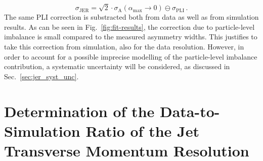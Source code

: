 \begin{equation}
\sigma_\mathrm{JER} =  \sqrt{2} \cdot \sigma_\mathrm{A}(\alpha_\mathrm{max} \rightarrow 0) \ominus \sigma_\mathrm{PLI} \, .
\end{equation}  
The same PLI correction is substracted both from data as well as from simulation results. As can be seen in Fig.~\ref{fig:fit-results}, the correction due to particle-level imbalance is small compared to the measured asymmetry widths. This justifies to take this correction from simulation, also for the data resolution. However, in order to account for a possible imprecise modelling of the particle-level imbalance contribution, a systematic uncertainty will be considered, as discussed in Sec.~\ref{sec:jer_syst_unc}.

\section[Determination of the Data-to-Simulation Ratio]{Determination of the Data-to-Simulation Ratio of the Jet Transverse Momentum Resolution}
\label{sec:jer_ratio_determination}
